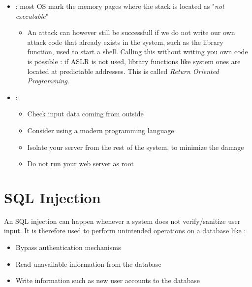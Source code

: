 \begin{itemize}
\begin{itemize}
        \end{itemize}
    \item {} : most OS mark the memory pages where the stack is located as "\textit{not executable}"
        \begin{itemize}
            \item An attack can however still be successfull if we do not write our own attack code that already exists in the system, such as the  library function, used to start a shell. Calling this without writing you own code is possible : if ASLR is not used, library functions like system ones are located at predictable addresses. This is called \textit{Return Oriented Programming}.
        \end{itemize}
    \item {} : 
        \begin{itemize}
            \item Check input data coming from outside
            \item Consider using a modern programming language
            \item Isolate your server from the rest of the system, to minimize the damage
            \item Do not run your web server as root
        \end{itemize}
\end{itemize}

\chapter{SQL Injection}

An SQL injection can happen whenever a system does not verify/sanitize user input. It is therefore used to perform unintended operations on a database like :
\begin{itemize}
    \item Bypass authentication mechanisms
    \item Read unavailable information from the database
    \item Write information such as new user accounts to the database
\end{itemize}

